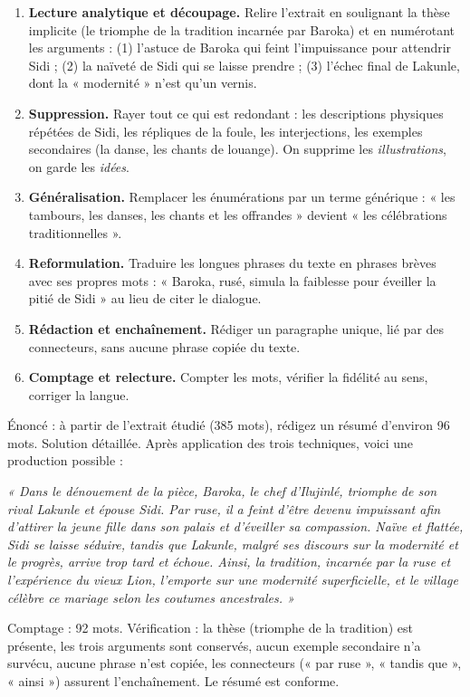 \documentclass[11pt]{article}
\begin{document}
\begin{methode}
\begin{enumerate}
\item \textbf{Lecture analytique et découpage.} Relire l'extrait en soulignant la thèse implicite (le triomphe de la tradition incarnée par Baroka) et en numérotant les arguments : (1) l'astuce de Baroka qui feint l'impuissance pour attendrir Sidi ; (2) la naïveté de Sidi qui se laisse prendre ; (3) l'échec final de Lakunle, dont la « modernité » n'est qu'un vernis.
\item \textbf{Suppression.} Rayer tout ce qui est redondant : les descriptions physiques répétées de Sidi, les répliques de la foule, les interjections, les exemples secondaires (la danse, les chants de louange). On supprime les \emph{illustrations}, on garde les \emph{idées}.
\item \textbf{Généralisation.} Remplacer les énumérations par un terme générique : « les tambours, les danses, les chants et les offrandes » devient « les célébrations traditionnelles ».
\item \textbf{Reformulation.} Traduire les longues phrases du texte en phrases brèves avec ses propres mots : « Baroka, rusé, simula la faiblesse pour éveiller la pitié de Sidi » au lieu de citer le dialogue.
\item \textbf{Rédaction et enchaînement.} Rédiger un paragraphe unique, lié par des connecteurs, sans aucune phrase copiée du texte.
\item \textbf{Comptage et relecture.} Compter les mots, vérifier la fidélité au sens, corriger la langue.
\end{enumerate}
\end{methode}

\begin{exoresolu}
Énoncé : à partir de l'extrait étudié (385 mots), rédigez un résumé d'environ 96 mots.
\tcblower
Solution détaillée. Après application des trois techniques, voici une production possible :

\emph{« Dans le dénouement de la pièce, Baroka, le chef d'Ilujinlé, triomphe de son rival Lakunle et épouse Sidi. Par ruse, il a feint d'être devenu impuissant afin d'attirer la jeune fille dans son palais et d'éveiller sa compassion. Naïve et flattée, Sidi se laisse séduire, tandis que Lakunle, malgré ses discours sur la modernité et le progrès, arrive trop tard et échoue. Ainsi, la tradition, incarnée par la ruse et l'expérience du vieux Lion, l'emporte sur une modernité superficielle, et le village célèbre ce mariage selon les coutumes ancestrales. »}

Comptage : 92 mots. Vérification : la thèse (triomphe de la tradition) est présente, les trois arguments sont conservés, aucun exemple secondaire n'a survécu, aucune phrase n'est copiée, les connecteurs (« par ruse », « tandis que », « ainsi ») assurent l'enchaînement. Le résumé est conforme.
\end{exoresolu}
\end{document}

